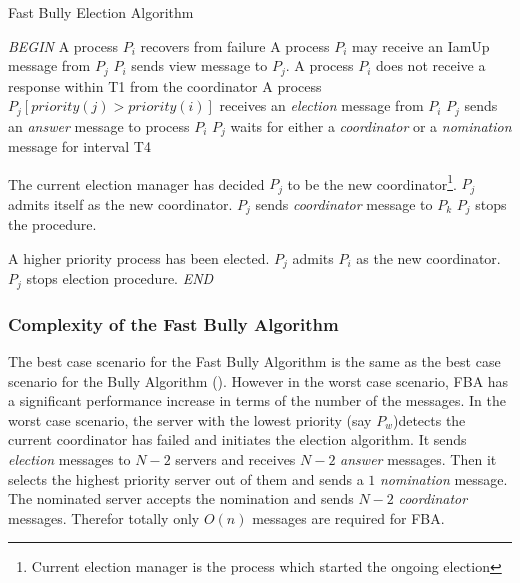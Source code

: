 \documentclass[dareport.tex]{subfiles}
\begin{document}
\begin{algorithm}[H]
	\caption{Fast Bully Election Algorithm}
	\label{fast-bully-algorithm}
	\begin{algorithmic}[1]
		\BState \emph{BEGIN}
		\State A process $P_{i}$ recovers from failure
			\State\indent{}
		\State A process $P_{i}$ may receive an IamUp message from $P_{j}$
			\State\indent $P_{i}$ sends view message to $P_{j}$.
		\State A process $P_{i}$ does not receive a response within T1 from the coordinator
			\State\indent{}
		\State A process $P_{j} \left[priority(j) > priority(i)\right]$ receives an \emph{election} message from $P_{i}$
			\State\indent $P_{j}$ sends an \emph{answer} message to process $P_{i}$
			\State\indent $P_{j}$ waits for either a \emph{coordinator} or a \emph{nomination} message for interval T4
			\State{}
				\State\indent\indent{}
			
			
			\Comment The current election manager has decided $P_{j}$ to be the new coordinator\footnote{Current election manager is the process which started the ongoing election}.
				\State\indent $P_{j}$ admits itself as the new coordinator.
				\State{}
					\State\indent\indent $P_{j}$ sends \emph{coordinator} message to $P_{k}$
					\State\indent\indent $P_{j}$ stops the procedure.
			
			\Comment A higher priority process has been elected.
				\State\indent $P_{j}$ admits $P_{i}$ as the new coordinator.
				\State\indent $P_{j}$ stops election procedure.
		\BState \emph{END}
	\end{algorithmic}
\end{algorithm}
\subsubsection{Complexity of the Fast Bully Algorithm}
The best case scenario for the Fast Bully Algorithm is the same as the best case scenario for the Bully Algorithm (). However in the worst case scenario, FBA has a significant performance increase in terms of the number of the messages. In the worst case scenario, the server with the lowest priority (say $ P_w $)detects the current coordinator has failed and initiates the election algorithm. It sends \emph{election} messages to $ N-2 $ servers and receives $ N-2 $ \emph{answer} messages. Then it selects the highest priority server out of them and sends a $ 1 $ \emph{nomination} message. The nominated server accepts the nomination and sends $ N-2 $ \emph{coordinator} messages. Therefor totally only $ O(n) $ messages are required for FBA.
\end{document}
